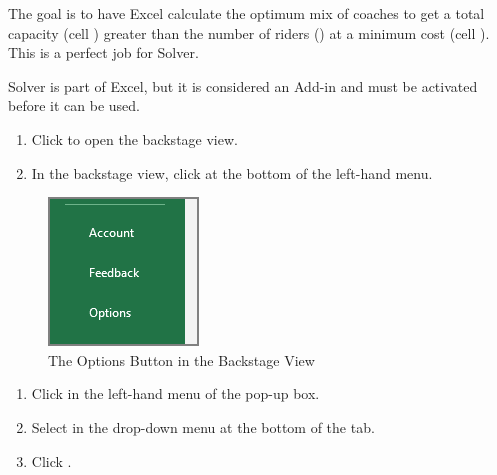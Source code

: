 The goal is to have Excel calculate the optimum mix of coaches to get a total capacity (cell ) greater than the number of riders () at a minimum cost (cell ). This is a perfect job for Solver.

Solver is part of Excel, but it is considered an Add-in and must be activated before it can be used.

\begin{enumerate}[resume]
	\item Click  to open the backstage view.
	\item In the backstage view, click  at the bottom of the left-hand menu.
	
\end{enumerate}

\begin{figure}[H]
\centering
\includegraphics[width=\maxwidth{.95\linewidth}]{gfx/ch08_fig35}
\caption{The Options Button in the Backstage View}
\label{08:fig35}
\end{figure}

\begin{enumerate}[resume]	
	
	\item Click  in the left-hand menu of the  pop-up box.
	\item Select  in the drop-down menu at the bottom of the  tab.
	\item Click .
	
\end{enumerate}


